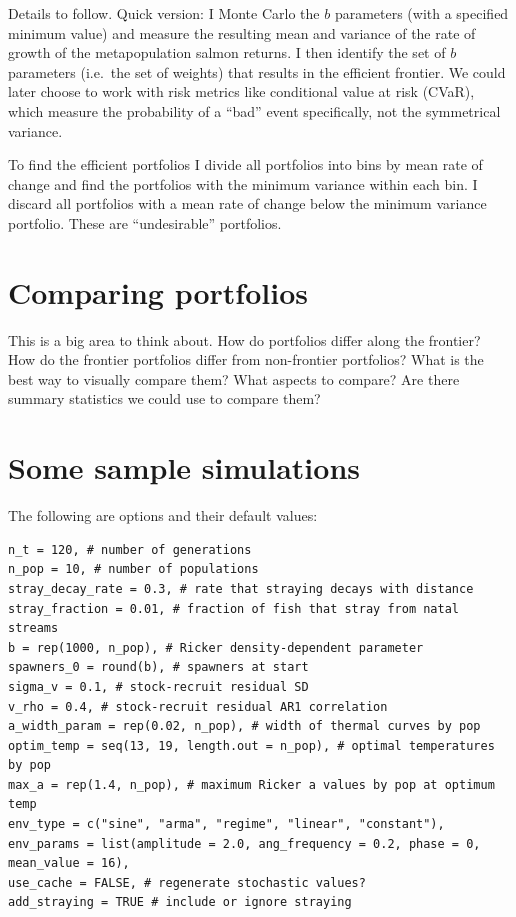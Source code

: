 \documentclass[12pt]{article}
\begin{document}
Details to follow. Quick version: I Monte Carlo the $b$ parameters (with
a specified minimum value) and measure the resulting mean and variance
of the rate of growth of the metapopulation salmon returns. I then
identify the set of $b$ parameters (i.e.~the set of weights) that
results in the efficient frontier. We could later choose to work with
risk metrics like conditional value at risk (CVaR), which measure the
probability of a ``bad'' event specifically, not the symmetrical
variance.

To find the efficient portfolios I divide all portfolios into bins by
mean rate of change and find the portfolios with the minimum variance
within each bin. I discard all portfolios with a mean rate of change
below the minimum variance portfolio. These are ``undesirable''
portfolios.

\section{Comparing portfolios}

This is a big area to think about. How do portfolios differ along the
frontier? How do the frontier portfolios differ from non-frontier
portfolios? What is the best way to visually compare them? What aspects
to compare? Are there summary statistics we could use to compare them?

\section{Some sample simulations}

The following are options and their default values:

\begin{verbatim}
n_t = 120, # number of generations
n_pop = 10, # number of populations
stray_decay_rate = 0.3, # rate that straying decays with distance
stray_fraction = 0.01, # fraction of fish that stray from natal streams
b = rep(1000, n_pop), # Ricker density-dependent parameter
spawners_0 = round(b), # spawners at start
sigma_v = 0.1, # stock-recruit residual SD
v_rho = 0.4, # stock-recruit residual AR1 correlation
a_width_param = rep(0.02, n_pop), # width of thermal curves by pop
optim_temp = seq(13, 19, length.out = n_pop), # optimal temperatures by pop
max_a = rep(1.4, n_pop), # maximum Ricker a values by pop at optimum temp
env_type = c("sine", "arma", "regime", "linear", "constant"),
env_params = list(amplitude = 2.0, ang_frequency = 0.2, phase = 0, mean_value = 16),
use_cache = FALSE, # regenerate stochastic values? 
add_straying = TRUE # include or ignore straying
\end{verbatim}
\end{document}
